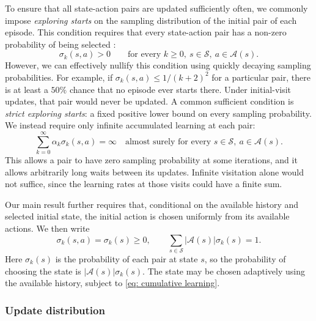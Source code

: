 \documentclass[twoside,11pt]{article}
\DeclareRobustCommand{\reviewbarstart}{%
  \ifhmode %
    \vadjust{\vbox to 0pt{%
      \vskip-\ht\strutbox %
      \vskip-\dp\strutbox %
      \cbstart[\changebarwidth] %
      \vss %
    }}%
  \else %
    \cbstart[\changebarwidth]%
  \fi %
} %
\providecommand{\DIFadd}[1]{#1} %
\providecommand{\DIFaddbegin}{\reviewbarstart} %
\providecommand{\DIFaddend}{\protect\cbend} %
\def\DIFadd#1{#1}%
\def\DIFaddbegin{}%
\def\DIFaddend{}%
\begin{document}
To ensure that all state-action pairs are updated sufficiently often, we commonly impose \textit{exploring starts} on the sampling distribution of the initial  pair of each episode. This condition requires that every state-action pair has a non-zero probability of being selected \DIFaddbegin \DIFadd{:
}\[
\DIFadd{\sigma_k(s,a)>0\qquad\text{for every }k\ge0,\ s\in\mathcal S,\ a\in\mathcal A(s).
}\]\DIFaddend 
However, we can effectively nullify this condition using quickly decaying sampling  \DIFaddbegin \DIFadd{probabilities}\DIFaddend .
For example, if  \DIFaddbegin \DIFadd{$\sigma_k(s,a)\le1/(k+2)^2$ for a particular pair}\DIFaddend , there is \DIFaddbegin \DIFadd{at least }\DIFaddend a $50\%$ chance that no episode ever starts  \DIFaddbegin \DIFadd{there}\DIFaddend . Under initial-visit updates, that pair would  never be updated.
 \DIFaddbegin \DIFadd{A common sufficient condition is }\DIFaddend \textit{strict exploring starts}:  \DIFaddbegin \DIFadd{a fixed positive lower bound on every sampling probability. We instead require only infinite accumulated learning at each pair:
}\begin{equation}
\DIFadd{\label{eq: cumulative learning}
\sum_{k=0}^{\infty}\alpha_k\sigma_k(s,a)=\infty
\quad\text{almost surely for every }s\in\mathcal S,\ a\in\mathcal A(s).
}\end{equation}\DIFaddend 
\DIFaddbegin \DIFadd{This allows a pair to have zero sampling probability at some iterations, and it allows arbitrarily long waits between its updates. Infinite visitation alone would not suffice, since the learning rates at those visits could have a finite sum.
}\DIFaddend 

\DIFaddbegin \DIFadd{Our main result further requires that, conditional on the available history and selected initial state, the initial action is chosen uniformly from its available actions. We then write
}\begin{equation}
\DIFadd{\label{eq: uniform starts}
\sigma_k(s,a)=\sigma_k(s)\ge0,
\qquad
\sum_{s\in\mathcal S}|\mathcal A(s)|\sigma_k(s)=1.
}\end{equation}
\DIFadd{Here $\sigma_k(s)$ is the probability of each pair at state $s$, so the probability of choosing the state is $|\mathcal A(s)|\sigma_k(s)$. The state may be chosen adaptively using the available history, subject to \eqref{eq: cumulative learning}.
}

\DIFaddend \subsubsection{Update distribution}
\end{document}
